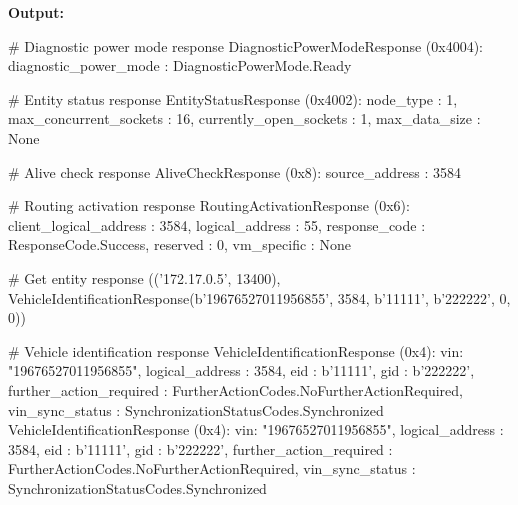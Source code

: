 \newpage

\textbf{Output:}
\begin{pythoncode}
   # Diagnostic power mode response
   DiagnosticPowerModeResponse (0x4004): { diagnostic_power_mode : DiagnosticPowerMode.Ready }
   
   # Entity status response
   EntityStatusResponse (0x4002): { node_type : 1, max_concurrent_sockets : 16, currently_open_sockets : 1, max_data_size : None }
   
   # Alive check response
   AliveCheckResponse (0x8): { source_address : 3584 }
   
   # Routing activation response
   RoutingActivationResponse (0x6): { client_logical_address : 3584, logical_address : 55, response_code : ResponseCode.Success, reserved : 0, vm_specific : None }  
   
   # Get entity response
   (('172.17.0.5', 13400), VehicleIdentificationResponse(b'19676527011956855', 3584, b'11111', b'222222', 0, 0))
   
   # Vehicle identification response
   VehicleIdentificationResponse (0x4): { vin: "19676527011956855", logical_address : 3584, eid : b'11111', gid : b'222222', further_action_required : FurtherActionCodes.NoFurtherActionRequired, vin_sync_status : SynchronizationStatusCodes.Synchronized }
   VehicleIdentificationResponse (0x4): { vin: "19676527011956855", logical_address : 3584, eid : b'11111', gid : b'222222', further_action_required : FurtherActionCodes.NoFurtherActionRequired, vin_sync_status : SynchronizationStatusCodes.Synchronized }
\end{pythoncode}

